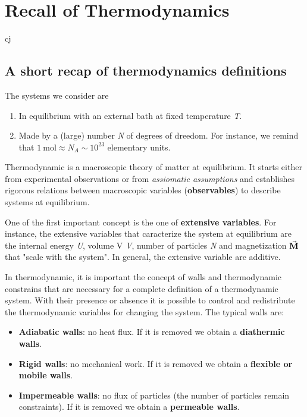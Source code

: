 \documentclass[../main/main.tex]{subfiles}
\begin{document}
\chapter{Recall of Thermodynamics}

cj
\section{A short recap of thermodynamics definitions}
\noindent The systems we consider are

\begin{enumerate}
\item In equilibrium with an external bath at fixed temperature \emph{T}.
\item Made by a (large) number \emph{N} of degrees of dreedom. For instance, we remind that \( \SI{1}{\mole} \approx N_A \sim 10^{23}\) elementary units.
\end{enumerate}

\noindent Thermodynamic is a macroscopic theory of matter at equilibrium.
It starts either from experimental observations or from \emph{assiomatic assumptions} and establishes rigorous relations between macroscopic variables (\textbf{observables}) to describe systems at equilibrium.

One of the first important concept is the one of \textbf{extensive variables}. For instance, the extensive variables that caracterize the system at equilibrium are the internal energy \emph{U}, volume V \emph{V}, number of particles \emph{N} and magnetization \( \va{M} \) that "scale with the system".
In general, the extensive variable are additive.

In thermodynamic, it is important the concept of walls and thermodynamic constrains that are necessary for a complete definition of a thermodynamic system. With their presence or absence it is possible to control and redistribute the thermodynamic variables for changing the system.
The typical walls are:
\begin{itemize}
\item \textbf{Adiabatic walls}: no heat flux. If it is removed we obtain a \textbf{diathermic walls}.
\item \textbf{Rigid walls}: no mechanical work. If it is removed we obtain a \textbf{flexible or mobile walls}.
\item \textbf{Impermeable walls}: no flux of particles (the number of particles remain constraints). If it is removed we obtain a \textbf{permeable walls}.
\end{itemize}
\end{document}
